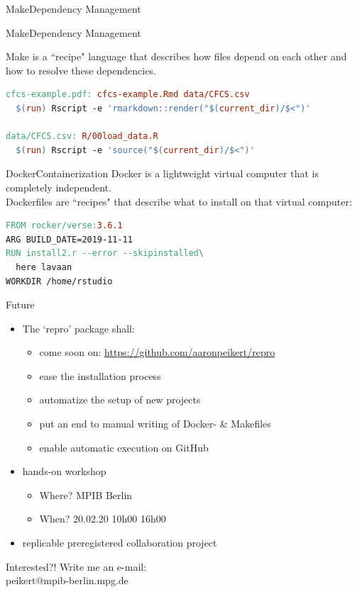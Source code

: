 \documentclass[12pt,t]{beamer}
\begin{document}
{\begin{frame}[c]{Make\textemdash{}Dependency Management}
\end{frame}

\begin{frame}[c, fragile]{Make\textemdash{}Dependency Management}

Make is a ``recipe" language that describes how files depend on each other and how to resolve these dependencies.
\vspace{10mm}
\begin{lstlisting}[language=make,basicstyle=\ttfamily\scriptsize]
cfcs-example.pdf: cfcs-example.Rmd data/CFCS.csv
  $(run) Rscript -e 'rmarkdown::render("$(current_dir)/$<")'

data/CFCS.csv: R/00load_data.R
  $(run) Rscript -e 'source("$(current_dir)/$<")'
\end{lstlisting}
\end{frame}

\begin{frame}[c, fragile]{Docker\textemdash{}Containerization}
	Docker is a lightweight virtual computer that is completely independent.\\
	Dockerfiles are ``recipes" that describe what to install on that virtual computer:
	\vspace{10mm}
	\begin{lstlisting}[language=make,basicstyle=\ttfamily\scriptsize]
FROM rocker/verse:3.6.1
ARG BUILD_DATE=2019-11-11
RUN install2.r --error --skipinstalled\
  here lavaan
WORKDIR /home/rstudio
\end{lstlisting}
\end{frame}

\begin{frame}[c]{Future}

\begin{itemize}
	\item The `repro' package shall:
	\begin{itemize}
		\item come soon on: \href{https://github.com/aaronpeikert/repro}{https://github.com/aaronpeikert/repro}
		\item ease the installation process
		\item automatize the setup of new projects
		\item put an end to manual writing of Docker- \& Makefiles
		\item enable automatic execution on GitHub
	\end{itemize}
	\item hands-on workshop
	\begin{itemize}
		\item Where? MPIB Berlin
		\item When? 20.02.20 10h00 \textendash{} 16h00
	\end{itemize}
	\item \textcolor{lolit}{replicable preregistered collaboration project}
\end{itemize}
\vspace{10mm}
Interested?! Write me an e-mail:\\ \hfill \textcolor{lolit}{peikert@mpib-berlin.mpg.de}
\end{frame}

}
\end{document}
